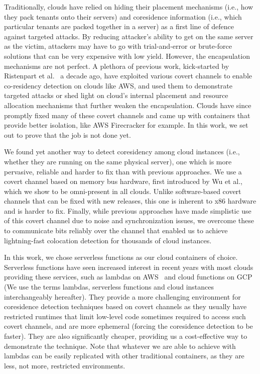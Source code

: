 Traditionally, clouds have relied on hiding their placement mechanisms (i.e., 
how they pack tenants onto their servers) and coresidence information (i.e., which 
particular tenants are packed together in a server) as a first line of defence 
against targeted attacks. By reducing attacker's ability to get on the 
same server as the victim, attackers may have to go with trial-and-error
or brute-force solutions that can be very expensive with low yield. However, 
the encapsulation mechanisms are not perfect. A plethora of previous work, 
kick-started by Ristenpart et al.~\cite{ristenpartccs2009} a decade ago, have 
exploited various covert channels to enable co-residency detection on clouds 
like AWS, and used them to demonstrate targeted attacks or shed light on 
cloud's internal placement and resource allocation mechanisms that 
further weaken the encapsulation. Clouds have since promptly fixed 
many of these covert channels and came up with containers that provide better 
isolation, like AWS Firecracker\cite{firecracker} for example. In this work,
we set out to prove that the job is not done yet.


We found yet another way to detect coresidency among cloud instances (i.e., whether 
they are running on the same physical server), one which is more pervasive, reliable 
and harder to fix than with previous approaches. We use a covert channel 
based on memory bus hardware, first introduced by Wu et al.\cite{wuusenix2012}, 
which we show to be omni-present in all clouds. Unlike software-based covert 
channels that can be fixed with new releases, this one is inherent to x86 hardware
and is harder to fix. Finally, while previous approaches have made simplistic 
use of this covert channel\cite{varadarajan2015} due to noise and synchronization 
issues, we overcome these to communicate bits reliably over the channel that enabled 
us to achieve lightning-fast colocation detection for thousands of cloud instances.


In this work, we chose serverless functions as our cloud containers of choice.
Serverless functions have seen increased interest in recent years with most clouds 
providing these services, such as lambdas on AWS~\cite{awslambda} and cloud functions on GCP~\cite{gcpfunctions} (We use the terms lambdas, serverless functions and cloud instances 
interchangeably hereafter). They provide a more challenging environment for coresidence 
detection techniques based on covert channels as they usually have restricted runtimes 
that limit low-level code sometimes required to access such covert channels, and are more ephemeral (forcing the coresidence detection 
to be faster). They are also significantly cheaper, providing us a cost-effective way to demonstrate the technique. Note that whatever we are able to achieve with lambdas 
can be easily replicated with other traditional containers, as they are less, not more, 
restricted environments.


